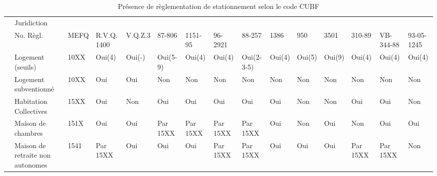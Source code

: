   \begin{landscape}
    \begin{center}
    \begin{longtable}{m{0.5cm} | p{2.5cm}  *{13}{|m{1.2cm}}|} 
       & Juridiction &  &  &  &  &  &  &  &  &  &  &  &  &  \\
      & No. Règl. & MEFQ & R.V.Q. 1400 & V.Q.Z.3 & 87-806 & 1151-95 & 96-2921 & 88-257 & 1386 & 950 & 3501 & 310-89 & VB-344-88 & 93-05-1245\\\hline  
      \endhead
      \hline
      \caption{Présence de règlementation de stationnement selon le code \ac{CUBF}}\label{tab:req_stat_presents}
      \endlastfoot
      & Logement (seuils) & \hspace{3mm}10XX & Oui(4) & Oui(-) & Oui(5-9) & Oui(4) &  Oui(4) & Oui(2-3-5) & Oui(4) & Oui(5) & Oui(9) & Oui(4) & Oui(4) & Oui(4)\\
      & Logement subventionné & \hspace{3mm}10XX & Oui &Oui & Non & Non & Non & Non & Non & Non & Non & Non & Non & Non \\
      & Habitation Collectives & \hspace{3mm}15XX & Oui &  Non & Oui & Oui & Oui & Oui & Oui & Non & Non & Oui & Oui &  Non \\
      & Maison de chambres & \hspace{6mm} 151X & Oui & Oui &  Par 15XX &  Par 15XX &  Par 15XX &  Par 15XX & Oui &  Non & Oui &  Non & Oui & Oui\\
      & Maison de retraite non autonomes & \hspace{12mm}1541 &  Par 15XX & Oui & Oui & Oui &  Par 15XX &  Par 15XX & Oui & Oui & Oui &  Par 15XX &  Par 15XX & Non \\

\end{longtable}
\end{center}
\end{landscape}
